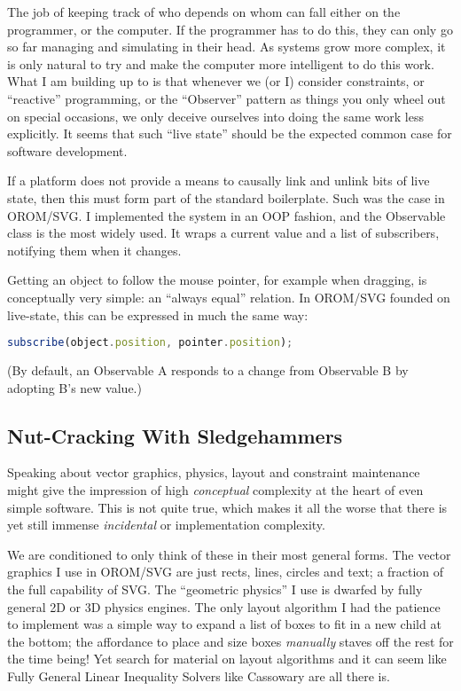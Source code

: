 The job of keeping track of who depends on whom can fall either on the
programmer, or the computer. If the programmer has to do this, they can
only go so far managing and simulating in their head. As systems grow
more complex, it is only natural to try and make the computer more
intelligent to do this work. What I am building up to is that whenever
we (or I) consider constraints, or ``reactive'' programming, or the
``Observer'' pattern as things you only wheel out on special occasions,
we only deceive ourselves into doing the same work less explicitly. It
seems that such ``live state'' should be the expected common case for
software development.

If a platform does not provide a means to causally link and unlink bits
of live state, then this must form part of the standard boilerplate.
Such was the case in OROM/SVG. I implemented the system in an OOP
fashion, and the Observable class is the most widely used. It wraps a
current value and a list of subscribers, notifying them when it changes.

Getting an object to follow the mouse pointer, for example when
dragging, is conceptually very simple: an ``always equal'' relation. In
OROM/SVG founded on live-state, this can be expressed in much the same
way:

\begin{lstlisting}[language=JavaScript, numbers=none]
subscribe(object.position, pointer.position);
\end{lstlisting}

(By default, an Observable A responds to a change from Observable B by
adopting B's new value.)

\hypertarget{nut-cracking-with-sledgehammers}{%
\subsection{Nut-Cracking With
Sledgehammers}\label{nut-cracking-with-sledgehammers}}

Speaking about vector graphics, physics, layout and constraint
maintenance might give the impression of high \emph{conceptual}
complexity at the heart of even simple software. This is not quite true,
which makes it all the worse that there is yet still immense
\emph{incidental} or implementation complexity.

We are conditioned to only think of these in their most general forms.
The vector graphics I use in OROM/SVG are just rects, lines, circles and
text; a fraction of the full capability of SVG. The ``geometric
physics'' I use is dwarfed by fully general 2D or 3D physics engines.
The only layout algorithm I had the patience to implement was a simple
way to expand a list of boxes to fit in a new child at the bottom; the
affordance to place and size boxes \emph{manually} staves off the rest
for the time being! Yet search for material on layout algorithms and it
can seem like Fully General Linear Inequality Solvers like Cassowary are
all there is.

